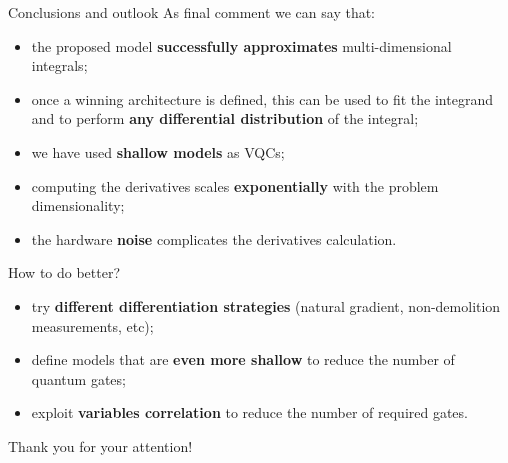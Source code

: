 \documentclass[8pt, xcolor={svgnames}, hyperref={linkcolor=black}]{beamer}
\begin{document}
\begin{frame}{Conclusions and outlook}
As final comment we can say that:
\pause
\begin{itemize}[noitemsep]
\item[\faThumbsOUp] the proposed model \textbf{successfully approximates} multi-dimensional integrals;
\pause
\item[\faThumbsOUp] once a winning architecture is defined, this can be used to fit the integrand
and to perform \textbf{any differential distribution} of the integral;
\pause
\item[\faThumbsOUp] we have used \textbf{shallow models} as VQCs;
\pause
\item[\faThumbsODown] computing the derivatives scales \textbf{exponentially} 
with the problem dimensionality;
\pause
\item[\faThumbsODown] the hardware \textbf{noise} complicates the derivatives calculation.
\end{itemize}
\pause
How to do better?
\begin{itemize}[noitemsep]
\pause
\item[\faSend] try \textbf{different differentiation strategies} (natural gradient, non-demolition
measurements, etc);
\pause
\item[\faSend] define models that are \textbf{even more shallow} to reduce the number of quantum gates;
\pause
\item[\faSend] exploit \textbf{variables correlation} to reduce the number of required gates.
\end{itemize}
\end{frame}

\begin{frame}
\centering
\Large Thank you for your attention!
\end{frame}
\end{document}
